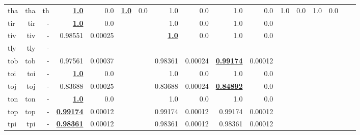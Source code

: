 \documentclass[11pt]{article}
\begin{document}
\begin{table*}[h]
{\begin{tabular}{lrrrrrrrrrrrrrrrr}
tha         & tha         & th         & \textbf{\underline{1.0}}         & 0.0         & \textbf{\underline{1.0}}         & 0.0         & 1.0         & 0.0         & 1.0         & 0.0         & 1.0         & 0.0         & 1.0         & 0.0         \\
tir         & tir         & -         & \textbf{\underline{1.0}}         & 0.0         &          &          & 1.0         & 0.0         & 1.0         & 0.0         &          &          &          &          \\
tiv         & tiv         & -         & 0.98551         & 0.00025         &          &          & \textbf{\underline{1.0}}         & 0.0         & 1.0         & 0.0         &          &          &          &          \\
tly         & tly         & -         &          &          &          &          &          &          &          &          &          &          &          &          \\
tob         & tob         & -         & 0.97561         & 0.00037         &          &          & 0.98361         & 0.00024         & \textbf{\underline{0.99174}}         & 0.00012         &          &          &          &          \\
toi         & toi         & -         & \textbf{\underline{1.0}}         & 0.0         &          &          & 1.0         & 0.0         & 1.0         & 0.0         &          &          &          &          \\
toj         & toj         & -         & 0.83688         & 0.00025         &          &          & 0.83688         & 0.00024         & \textbf{\underline{0.84892}}         & 0.0         &          &          &          &          \\
ton         & ton         & -         & \textbf{\underline{1.0}}         & 0.0         &          &          & 1.0         & 0.0         & 1.0         & 0.0         &          &          &          &          \\
top         & top         & -         & \textbf{\underline{0.99174}}         & 0.00012         &          &          & 0.99174         & 0.00012         & 0.99174         & 0.00012         &          &          &          &          \\
tpi         & tpi         & -         & \textbf{\underline{0.98361}}         & 0.00012         &          &          & 0.98361         & 0.00012         & 0.98361         & 0.00012         &          &          &          &          \\

\end{tabular}}
\end{table*}
\end{document}
